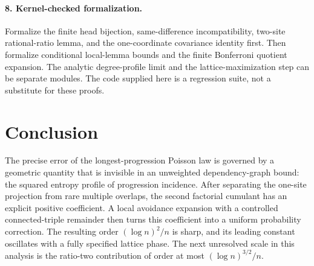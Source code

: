 \documentclass[11pt]{article}
\theoremstyle{definition}\newtheorem{definition}[theorem]{Definition}
\theoremstyle{remark}\newtheorem{remark}[theorem]{Remark}
\begin{document}
\paragraph{8. Kernel-checked formalization.}
Formalize the finite head bijection, same-difference incompatibility,
two-site rational-ratio lemma, and the one-coordinate covariance identity
first. Then formalize conditional local-lemma bounds and the finite
Bonferroni quotient expansion. The analytic degree-profile limit and the
lattice-maximization step can be separate modules. The code supplied here
is a regression suite, not a substitute for these proofs.

\section*{Conclusion}
The precise error of the longest-progression Poisson law is governed by
a geometric quantity that is invisible in an unweighted dependency-graph
bound: the squared entropy profile of progression incidence.
After separating the one-site projection from rare multiple overlaps,
the second factorial cumulant has an explicit positive coefficient.
A local avoidance expansion with a controlled connected-triple remainder
then turns this coefficient into a uniform probability correction.
The resulting order $(\log n)^2/n$ is sharp, and its leading constant
oscillates with a fully specified lattice phase. The next unresolved
scale in this analysis is the ratio-two contribution of order at most
$(\log n)^{3/2}/n$.

\clearpage


\end{document}
